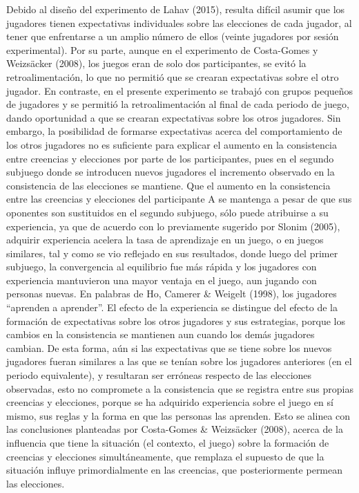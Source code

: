 Debido al diseño del experimento de Lahav (2015), resulta difícil asumir que los jugadores tienen expectativas individuales sobre las elecciones de cada jugador, al tener que enfrentarse a un amplio número de ellos (veinte jugadores por sesión experimental). Por su parte, aunque en el experimento de Costa-Gomes y Weizsäcker (2008), los juegos eran de solo dos participantes, se evitó la retroalimentación, lo que no permitió que se crearan expectativas sobre el otro jugador. En contraste, en el presente experimento se trabajó con grupos pequeños de jugadores y se permitió la retroalimentación al final de cada periodo de juego, dando oportunidad a que se crearan expectativas sobre los otros jugadores. Sin embargo, la  posibilidad de formarse expectativas acerca del comportamiento de los otros jugadores no es suficiente para explicar el aumento en la consistencia entre creencias y elecciones por parte de los participantes, pues en el segundo subjuego donde se introducen nuevos jugadores el incremento observado en la consistencia de las elecciones se mantiene.
Que el aumento en la consistencia entre las creencias y elecciones del participante A se mantenga a pesar de que sus oponentes son sustituidos en el segundo subjuego, sólo puede atribuirse a su experiencia, ya que de acuerdo con lo previamente sugerido por Slonim (2005), adquirir experiencia acelera la tasa de aprendizaje en un juego, o en juegos similares, tal y como se vio  reflejado en sus resultados, donde luego del primer subjuego, la convergencia al equilibrio fue más rápida y los jugadores con experiencia mantuvieron una mayor ventaja en el juego, aun jugando con personas nuevas. En palabras de Ho, Camerer & Weigelt (1998), los jugadores “aprenden a aprender”.
El efecto de la experiencia se distingue del efecto de la formación de expectativas sobre los otros jugadores y sus estrategias, porque los cambios en la consistencia se mantienen aun cuando los demás jugadores cambian. De esta forma, aún si las expectativas que se tiene sobre los nuevos jugadores fueran similares a las que se tenían sobre los jugadores anteriores (en el periodo equivalente), y resultaran ser erróneas respecto de las elecciones observadas, esto no compromete a la consistencia que se registra entre sus propias creencias y elecciones, porque se ha adquirido experiencia sobre el juego en sí mismo, sus reglas y la forma en que las personas las aprenden. Esto se alinea con las conclusiones planteadas por Costa-Gomes & Weizsäcker (2008), acerca de la influencia que tiene la situación (el contexto, el juego) sobre la formación de creencias y elecciones simultáneamente, que remplaza el supuesto de que la situación influye primordialmente en las creencias, que posteriormente permean las elecciones.
